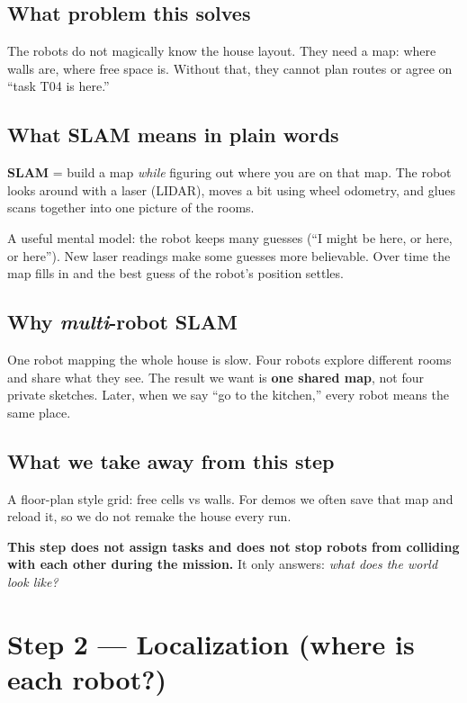 \documentclass[11pt,a4paper]{article}
\begin{document}
\subsection{What problem this solves}

The robots do not magically know the house layout. They need a map: where
walls are, where free space is. Without that, they cannot plan routes or
agree on ``task T04 is here.''

\subsection{What SLAM means in plain words}

\textbf{SLAM} = build a map \emph{while} figuring out where you are on that
map. The robot looks around with a laser (LIDAR), moves a bit using wheel
odometry, and glues scans together into one picture of the rooms.

A useful mental model: the robot keeps many guesses (``I might be here, or
here, or here''). New laser readings make some guesses more believable. Over
time the map fills in and the best guess of the robot's position settles.

\subsection{Why \emph{multi}-robot SLAM}

One robot mapping the whole house is slow. Four robots explore different
rooms and share what they see. The result we want is \textbf{one shared map},
not four private sketches. Later, when we say ``go to the kitchen,'' every
robot means the same place.

\subsection{What we take away from this step}

A floor-plan style grid: free cells vs walls. For demos we often save that map
and reload it, so we do not remake the house every run.

\textbf{This step does not assign tasks and does not stop robots from
colliding with each other during the mission.} It only answers: \emph{what
does the world look like?}

\section{Step 2 --- Localization (where is each robot?)}
\end{document}
